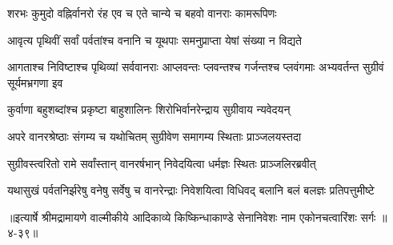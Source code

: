 \twolineshloka
{शरभः कुमुदो वह्निर्वानरो रंह एव च}
{एते चान्ये च बहवो वानराः कामरूपिणः} %

\twolineshloka
{आवृत्य पृथिवीं सर्वां पर्वतांश्च वनानि च}
{यूथपाः समनुप्राप्ता येषां संख्या न विद्यते} %

\threelineshloka
{आगताश्च निविष्टाश्च पृथिव्यां सर्ववानराः}
{आप्लवन्तः प्लवन्तश्च गर्जन्तश्च प्लवंगमाः}
{अभ्यवर्तन्त सुग्रीवं सूर्यमभ्रगणा इव} %

\twolineshloka
{कुर्वाणा बहुशब्दांश्च प्रकृष्टा बाहुशालिनः}
{शिरोभिर्वानरेन्द्राय सुग्रीवाय न्यवेदयन्} %

\twolineshloka
{अपरे वानरश्रेष्ठाः संगम्य च यथोचितम्}
{सुग्रीवेण समागम्य स्थिताः प्राञ्जलयस्तदा} %

\twolineshloka
{सुग्रीवस्त्वरितो रामे सर्वांस्तान् वानरर्षभान्}
{निवेदयित्वा धर्मज्ञः स्थितः प्राञ्जलिरब्रवीत्} %

\twolineshloka
{यथासुखं पर्वतनिर्झरेषु वनेषु सर्वेषु च वानरेन्द्राः}
{निवेशयित्वा विधिवद् बलानि बलं बलज्ञः प्रतिपत्तुमीष्टे} %


॥इत्यार्षे श्रीमद्रामायणे वाल्मीकीये आदिकाव्ये किष्किन्धाकाण्डे सेनानिवेशः नाम एकोनचत्वारिंशः सर्गः ॥४-३९॥
